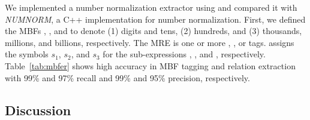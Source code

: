 We implemented a number normalization extractor using \framework and 
compared it with {\em NUMNORM}, a 
C++ implementation for number normalization. 
First, we defined the MBFs , , and 
to denote (1) digits and tens, (2) hundreds, and (3) 
thousands, millions, and billions, respectively.
The  MRE 
 is one or more , , or  tags. 
\framework assigns the symbols $s_1$, $s_2$, and $s_3$ 
for the sub-expressions , , and , respectively. 
%
Table~\ref{tab:mbfer} shows high accuracy in MBF tagging and relation extraction 
with 99\% and 97\% recall and 99\% and 95\% precision, respectively. 

\vspace{-1.5em}
\subsection{Discussion}
\label{subsec:discuss}
\label{sec:discuss}

